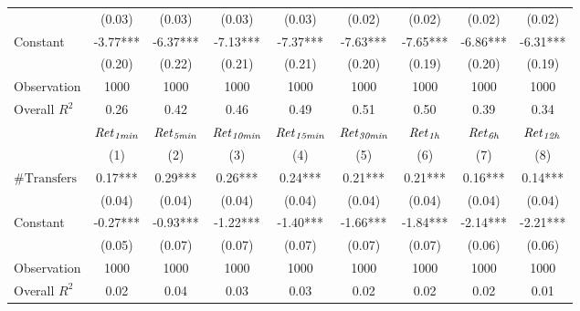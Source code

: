 \begin{tabular}{lcccccccc}
 & (0.03) & (0.03) & (0.03) & (0.03) & (0.02) & (0.02) & (0.02) & (0.02) \\
Constant & -3.77*** & -6.37*** & -7.13*** & -7.37*** & -7.63*** & -7.65*** & -6.86*** & -6.31*** \\
 & (0.20) & (0.22) & (0.21) & (0.21) & (0.20) & (0.19) & (0.20) & (0.19) \\
Observation & 1000 & 1000 & 1000 & 1000 & 1000 & 1000 & 1000 & 1000 \\
Overall $R^2$ & 0.26 & 0.42 & 0.46 & 0.49 & 0.51 & 0.50 & 0.39 & 0.34 \\
\hline
 & ${\it Ret}_{\it 1min}$ & ${\it Ret}_{\it 5min}$ & ${\it Ret}_{\it 10min}$ & ${\it Ret}_{\it 15min}$ & ${\it Ret}_{\it 30min}$ & ${\it Ret}_{\it 1h}$ & ${\it Ret}_{\it 6h}$ & ${\it Ret}_{\it 12h}$ \\
 & (1) & (2) & (3) & (4) & (5) & (6) & (7) & (8) \\
\hline
$\#\text{Transfers}$ & 0.17*** & 0.29*** & 0.26*** & 0.24*** & 0.21*** & 0.21*** & 0.16*** & 0.14*** \\
 & (0.04) & (0.04) & (0.04) & (0.04) & (0.04) & (0.04) & (0.04) & (0.04) \\
Constant & -0.27*** & -0.93*** & -1.22*** & -1.40*** & -1.66*** & -1.84*** & -2.14*** & -2.21*** \\
 & (0.05) & (0.07) & (0.07) & (0.07) & (0.07) & (0.07) & (0.06) & (0.06) \\
Observation & 1000 & 1000 & 1000 & 1000 & 1000 & 1000 & 1000 & 1000 \\
Overall $R^2$ & 0.02 & 0.04 & 0.03 & 0.03 & 0.02 & 0.02 & 0.02 & 0.01 \\
\hline
\end{tabular}

